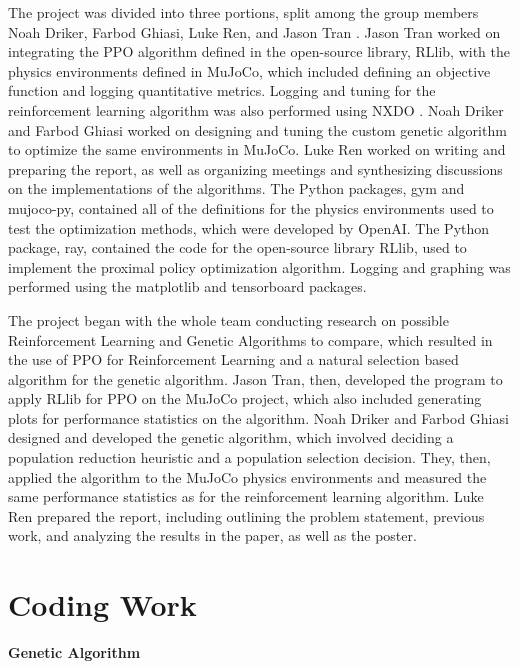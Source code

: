 \documentclass{article}
\begin{document}
    The project was divided into three portions, split among the group members  
Noah Driker, Farbod Ghiasi, Luke Ren, and Jason Tran \cite{authors}. Jason 
Tran  worked on integrating the PPO algorithm defined in the open-source 
library,  RLlib, with the physics environments defined in MuJoCo, which 
included defining an objective function and logging quantitative metrics. Logging and tuning for the reinforcement learning algorithm was also performed using NXDO \cite{nxdo}.
Noah Driker and Farbod Ghiasi worked on designing and tuning the custom genetic 
algorithm to optimize the same environments in MuJoCo. Luke Ren worked on 
writing and preparing the report, as well as organizing meetings and 
synthesizing discussions on the implementations of the algorithms. The Python 
packages, gym and mujoco-py, contained all of the definitions for the physics environments used to test the optimization methods, which were developed by  
OpenAI. The Python package, ray, contained the code for the open-source 
library RLlib, used to implement the proximal policy optimization algorithm. Logging and graphing was performed using the matplotlib \cite{matplotlib} and tensorboard packages.

The project began with the whole team conducting research on possible 
Reinforcement Learning and Genetic Algorithms to compare, which resulted in 
the use of PPO for Reinforcement Learning and a natural selection based 
algorithm for the genetic algorithm. Jason Tran, then, developed the program 
to apply RLlib for PPO on the MuJoCo project, which also included generating    plots for performance statistics on the algorithm. Noah Driker and Farbod     Ghiasi designed and developed the genetic algorithm, which involved deciding
a population reduction heuristic and a population selection decision. They, 
then, applied the algorithm to the MuJoCo physics environments and measured 
the same performance statistics as for the reinforcement learning algorithm.
Luke Ren prepared the report, including outlining the problem statement, 
previous work, and analyzing the results in the paper, as well as the poster.


\section{Coding Work}
\noindent\textbf{Genetic Algorithm}
\end{document}
